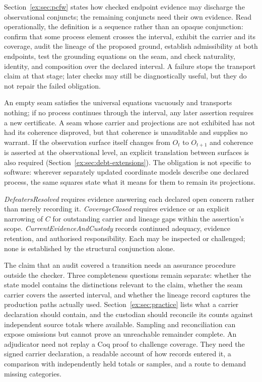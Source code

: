\documentclass[twocolumn,envcountsect,envcountsame,natbib]{svjour3}
\begin{document}
Section~\ref{ex:sec:pcfw} states how checked endpoint evidence may discharge the observational conjuncts; the remaining conjuncts need their own evidence. Read operationally, the definition is a sequence rather than an opaque conjunction: confirm that some process element crosses the interval, exhibit the carrier and its coverage, audit the lineage of the proposed ground, establish admissibility at both endpoints, test the grounding equations on the seam, and check naturality, identity, and composition over the declared interval. A failure stops the transport claim at that stage; later checks may still be diagnostically useful, but they do not repair the failed obligation.

An empty seam satisfies the universal equations vacuously and transports nothing; if no process continues through the interval, any later assertion requires a new certificate. A seam whose carrier and projections are not exhibited has not had its coherence disproved, but that coherence is unauditable and supplies no warrant. If the observation surface itself changes from $O_t$ to $O_{t+1}$ and coherence is asserted at the observational level, an explicit translation between surfaces is also required (Section~\ref{ex:sec:debt-extensions}). The obligation is not specific to software: wherever separately updated coordinate models describe one declared process, the same squares state what it means for them to remain its projections.

\emph{DefeatersResolved} requires evidence answering each declared open concern rather than merely recording it. \emph{CoverageClosed} requires evidence or an explicit narrowing of $C$ for outstanding carrier and lineage gaps within the assertion's scope. \emph{CurrentEvidenceAndCustody} records continued adequacy, evidence retention, and authorised responsibility. Each may be inspected or challenged; none is established by the structural conjunction alone.

The claim that an audit covered a transition needs an assurance procedure outside the checker. Three completeness questions remain separate: whether the state model contains the distinctions relevant to the claim, whether the seam carrier covers the asserted interval, and whether the lineage record captures the production paths actually used. Section~\ref{ex:sec:practice} lists what a carrier declaration should contain, and the custodian should reconcile its counts against independent source totals where available. Sampling and reconciliation can expose omissions but cannot prove an unreachable remainder complete. An adjudicator need not replay a Coq proof to challenge coverage. They need the signed carrier declaration, a readable account of how records entered it, a comparison with independently held totals or samples, and a route to demand missing categories.
\end{document}
